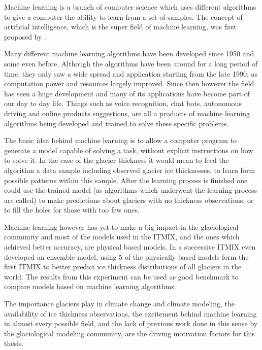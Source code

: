 Machine learning is a branch of computer science which uses different algorithms to give a computer the ability to learn from a set of samples. The concept of artificial intelligence, which is the super field of machine learning, was first proposed by \citet{Turing1950}.

Many different machine learning algorithms have been developed since 1950 and some even before. Although the algorithms have been around for a long period of time, they only saw a wide spread and application starting from the late 1990, as computation power and resources largely improved. Since then however the field has seen a huge development and many of its applications have become part of our day to day life. Things such as voice recognition, chat bots, autonomous driving and online products suggestions, are all a products of machine learning algorithms being developed and trained to solve these specific problems.

The basic idea behind machine learning is to allow a computer program to generate a model capable of solving a task, without explicit instructions on how to solve it. In the case of the glacier thickness it would mean to feed the algorithm a data sample including observed glacier ice thicknesses, to learn form possible patterns within this sample. After the learning process is finished one could use the trained model (as algorithms which underwent the learning process are called) to make predictions about glaciers with no thickness observations, or to fill the holes for those with too few ones.

Machine learning however has yet to make a big impact in the glaciological community and most of the models used in the ITMIX, and the ones which achieved better accuracy, are physical based models. In a successive ITMIX \citet{Farinotti2019} even developed an ensemble model, using 5 of the physically based models form the first ITMIX to better predict ice thickness distributions of all glaciers in the world. The results from this experiment can be used as good benchmark to compare models based on machine learning algorithms.

The importance glaciers play in climate change and climate modeling, the availability of ice thickness observations, the excitement behind machine learning in almost every possible field, and the lack of previous work done in this sense by the glaciological modeling community, are the driving motivation factors for this thesis.


